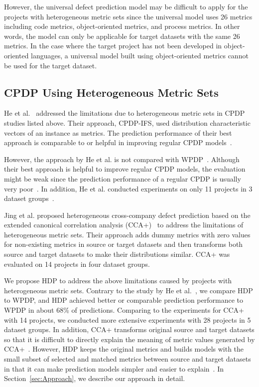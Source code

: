 However, the universal defect prediction model may be difficult to apply for the
projects with heterogeneous metric sets since the universal
model uses 26 metrics including code metrics, object-oriented metrics, and
process metrics. In other words, the model can only be applicable for
target datasets with the same 26 metrics. In the case where the target project
has not been developed in object-oriented languages, a universal model built
using object-oriented metrics cannot be used for the target dataset.

\subsection{CPDP Using Heterogeneous Metric Sets}
He et al.~\cite{He14} addressed the limitations due to
heterogeneous metric sets in CPDP studies listed
above.
Their approach, CPDP-IFS, used distribution
characteristic vectors of an instance as metrics.
The prediction performance of their best approach is comparable to or
helpful in improving regular CPDP models~\cite{He14}.

However, the approach by He et al. is not compared with WPDP~\cite{He14}.
Although their best approach is helpful to improve regular CPDP models, the
evaluation might be weak since the prediction performance of a regular CPDP is
usually very poor~\cite{Zimmermann09}. In addition, He et al. conducted
experiments on only 11 projects in 3 dataset groups~\cite{He14}.

Jing et al. proposed heterogeneous cross-company defect prediction based on the extended canonical correlation analysis (CCA+)~\cite{Jing15} to address the limitations of heterogeneous metric sets. Their approach adds dummy metrics with zero values for non-existing metrics in source or target datasets and then transforms both source and target datasets to make their distributions similar. CCA+ was evaluated on 14 projects in four dataset groups.

We propose HDP to address the above
limitations caused by projects with heterogeneous metric sets.
Contrary to the study by He et al.~\cite{He14}, we compare HDP to
WPDP, and HDP achieved better or comparable prediction performance to WPDP in
about 68\% of predictions.
Comparing to the experiments for CCA+~\cite{Jing15} with 14 projects, we conducted more extensive experiments with 28 projects in 5 dataset groups. In addition, CCA+ transforms original source and target datasets so that it is difficult to directly explain the meaning of metric values generated by CCA+~\cite{Jing15}. However, HDP keeps the original metrics and builds models with the small subset of selected and matched metrics between source and target datasets in that it can make prediction models simpler and easier to explain~\cite{Nam15HDP,Shihab14}. In
Section~\ref{sec:Approach}, we describe our approach in detail.

